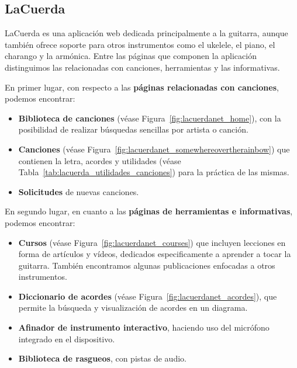 \subsection{LaCuerda}
LaCuerda\cite{lacuerdanet_home} es una aplicación web dedicada principalmente a la guitarra, aunque también ofrece soporte para otros instrumentos como el ukelele, el piano, el charango y la armónica. Entre las páginas que componen la aplicación distinguimos las relacionadas con canciones, herramientas y las informativas.

En primer lugar, con respecto a las \textbf{páginas relacionadas con canciones}, podemos encontrar:
\begin{itemize}
    \item \textbf{Biblioteca de canciones} (véase Figura~\ref{fig:lacuerdanet_home}), con la posibilidad de realizar búsquedas sencillas por artista o canción.
    \item \textbf{Canciones} (véase Figura~\ref{fig:lacuerdanet_somewhereovertherainbow}) que contienen la letra, acordes y utilidades (véase Tabla~\ref{tab:lacuerda_utilidades_canciones}) para la práctica de las mismas.
    \item \textbf{Solicitudes} de nuevas canciones.
\end{itemize}

En segundo lugar, en cuanto a las \textbf{páginas de herramientas e informativas}, podemos encontrar:
\begin{itemize}
    \item \textbf{Cursos} (véase Figura~\ref{fig:lacuerdanet_courses}) que incluyen lecciones en forma de artículos y vídeos, dedicados especificamente a aprender a tocar la guitarra. También encontramos algunas publicaciones enfocadas a otros instrumentos.
    \item \textbf{Diccionario de acordes} (véase Figura~\ref{fig:lacuerdanet_acordes}), que permite la búsqueda y visualización de acordes en un diagrama.
    \item \textbf{Afinador de instrumento interactivo}, haciendo uso del micrófono integrado en el dispositivo.
    \item \textbf{Biblioteca de rasgueos}, con pistas de audio.
\end{itemize}

